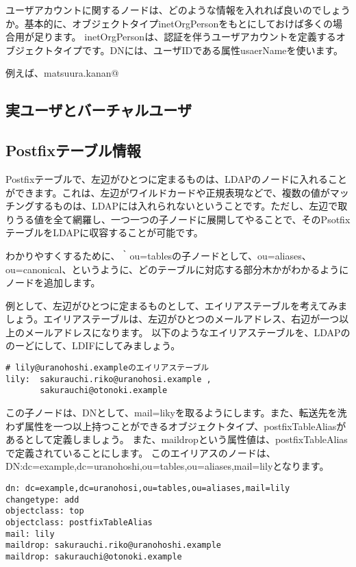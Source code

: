 ユーザアカウントに関するノードは、どのような情報を入れれば良いのでしょうか。基本的に、オブジェクトタイプinetOrgPersonをもとにしておけば多くの場合用が足ります。
inetOrgPersonは、認証を伴うユーザアカウントを定義するオブジェクトタイプです。DNには、ユーザIDである属性usaerNameを使います。

例えば、matsuura.kanan@

\subsection{実ユーザとバーチャルユーザ}





\subsection{Postfixテーブル情報}

Postfixテーブルで、左辺がひとつに定まるものは、LDAPのノードに入れることができます。これは、左辺がワイルドカードや正規表現などで、複数の値がマッチングするものは、LDAPには入れられないということです。ただし、左辺で取りうる値を全て網羅し、一つ一つの子ノードに展開してやることで、そのPsotfixテーブルをLDAPに収容することが可能です。

わかりやすくするために、｀ou=tablesの子ノードとして、ou=aliases、ou=canonical、というように、どのテーブルに対応する部分木かがわかるようにノードを追加します。

例として、左辺がひとつに定まるものとして、エイリアステーブルを考えてみましょう。エイリアステーブルは、左辺がひとつのメールアドレス、右辺が一つ以上のメールアドレスになります。
以下のようなエイリアステーブルを、LDAPののーどにして、LDIFにしてみましょう。

\begin{verbatim}
# lily@uranohoshi.exampleのエイリアステーブル
lily:  sakurauchi.riko@uranohosi.example , 
       sakurauchi@otonoki.example
\end{verbatim}

この子ノードは、DNとして、mail=likyを取るようにします。また、転送先を洗わず属性を一つ以上持つことができるオブジェクトタイプ、postfixTableAliasがあるとして定義しましょう。
また、maildropという属性値は、postfixTableAliasで定義されていることにします。
このエイリアスのノードは、DN:dc=example,dc=uranohoshi,ou=tables,ou=aliases,mail=lilyとなります。

\begin{verbatim}
dn: dc=example,dc=uranohosi,ou=tables,ou=aliases,mail=lily
changetype: add
objectclass: top
objectclass: postfixTableAlias
mail: lily
maildrop: sakurauchi.riko@uranohoshi.example
maildrop: sakurauchi@otonoki.example
\end{verbatim}


